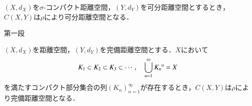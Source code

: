 	\begin{screen}
		\begin{thm}[$C(X,Y)$の可分性]
			$(X,d_X)$を$\sigma$-コンパクト距離空間，$(Y,d_Y)$を可分距離空間とするとき，$C(X,Y)$は$\rho$により可分距離空間となる．
		\end{thm}
	\end{screen}
	
	\begin{prf}\mbox{}
		\begin{description}
			\item[第一段]
				
		\end{description}
	\end{prf}
	
	\begin{screen}
		\begin{thm}[$C(X,Y)$の完備性]
			$(X,d_X)$を距離空間，$(Y,d_Y)$を完備距離空間とする．$X$において
			\begin{align}
				K_1 \subset K_2 \subset K_3 \subset \cdots,
				\quad \bigcup_{n=1}^\infty {\kern0ptK_n}^{\mathrm{o}} = X
				\label{eq:completeness_and_separability_of_space_of_continuous_functions_2}
			\end{align}
			を満たすコンパクト部分集合の列$(K_n)_{n=1}^\infty$が存在するとき，$C(X,Y)$は$\rho$により完備距離空間となる．
		\end{thm}
	\end{screen}
	

